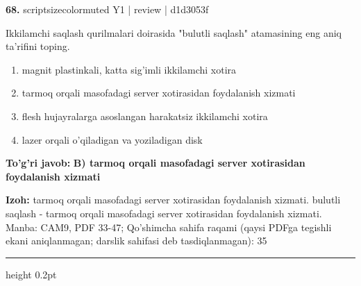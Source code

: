 \documentclass[10pt,a4paper]{article}
\begin{document}
{\bfseries\sffamily\color{ink} 68.} {scriptsizecolor{muted} Y1 | review | d1d3053f}
\par
Ikkilamchi saqlash qurilmalari doirasida "bulutli saqlash" atamasining eng aniq ta'rifini toping.
\begin{enumerate}[label=\Alph*),leftmargin=9mm]
\item magnit plastinkali, katta sig'imli ikkilamchi xotira
\item tarmoq orqali masofadagi server xotirasidan foydalanish xizmati
\item flesh hujayralarga asoslangan harakatsiz ikkilamchi xotira
\item lazer orqali o'qiladigan va yoziladigan disk
\end{enumerate}
\begin{tcolorbox}[enhanced,breakable,colback=teal!4,colframe=teal!60!black,boxrule=0.45pt,arc=1.2mm,left=2.7mm,right=2.7mm,top=1.8mm,bottom=1.8mm,before skip=2mm,after skip=2mm]
{\bfseries\sffamily\color{teal}To'g'ri javob:} \textbf{B) tarmoq orqali masofadagi server xotirasidan foydalanish xizmati}
\par\smallskip
{\bfseries Izoh:} tarmoq orqali masofadagi server xotirasidan foydalanish xizmati. bulutli saqlash - tarmoq orqali masofadagi server xotirasidan foydalanish xizmati. Manba: CAM9, PDF 33-47; Qo'shimcha sahifa raqami (qaysi PDFga tegishli ekani aniqlanmagan; darslik sahifasi deb tasdiqlanmagan): 35
\end{tcolorbox}
\vspace{2mm}\hrule height 0.2pt\vspace{3mm}
\end{document}
